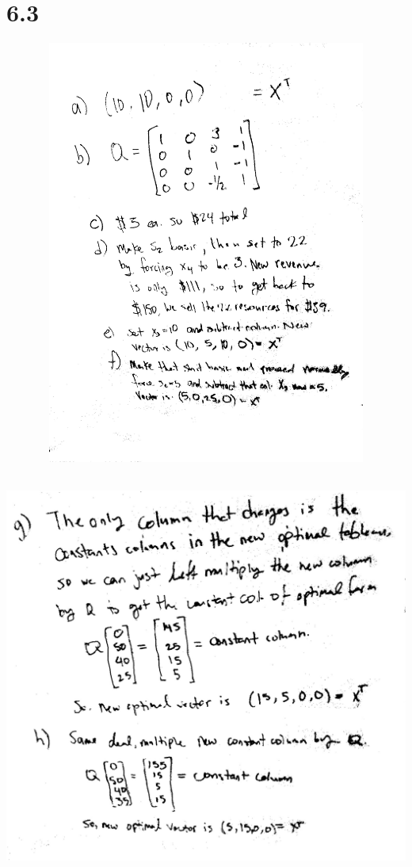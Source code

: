 \documentclass[a4paper,12pt]{article}
\begin{document}
\section*{6.3}
\includegraphics[width=14cm, height=14cm, keepaspectratio=true]{image/sixthree1.jpg}\\
\includegraphics[width=14cm, height=14cm, keepaspectratio=true]{image/sixthree2.jpg}\\
\end{document}

